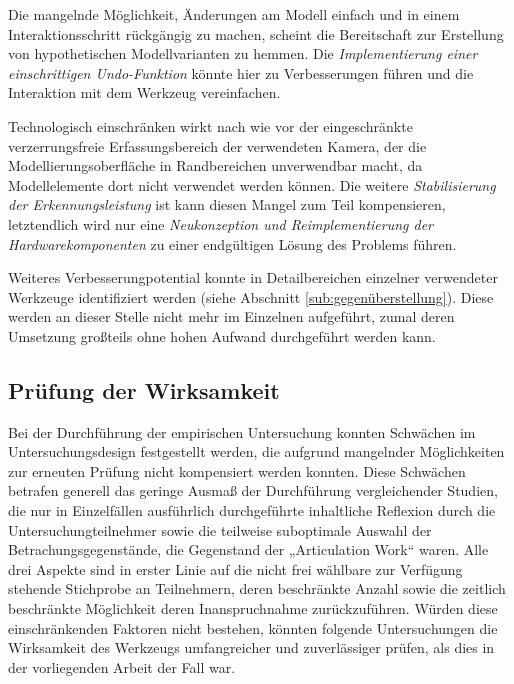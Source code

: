 Die mangelnde Möglichkeit, Änderungen am Modell einfach und in einem Interaktionsschritt rückgängig zu machen, scheint die Bereitschaft zur Erstellung von hypothetischen Modellvarianten zu hemmen. Die \emph{Implementierung einer einschrittigen Undo-Funktion} könnte hier zu Verbesserungen führen und die Interaktion mit dem Werkzeug vereinfachen.

Technologisch einschränken wirkt nach wie vor der eingeschränkte verzerrungsfreie Erfassungsbereich der verwendeten Kamera, der die Modellierungsoberfläche in Randbereichen unverwendbar macht, da Modellelemente dort nicht verwendet werden können. Die weitere \emph{Stabilisierung der Erkennungsleistung} ist kann diesen Mangel zum Teil kompensieren, letztendlich wird nur eine \emph{Neukonzeption und Reimplementierung der Hardwarekomponenten} zu einer endgültigen Lösung des Problems führen.

Weiteres Verbesserungpotential konnte in Detailbereichen einzelner verwendeter Werkzeuge identifiziert werden (siehe Abschnitt \ref{sub:gegenüberstellung}). Diese werden an dieser Stelle nicht mehr im Einzelnen aufgeführt, zumal deren Umsetzung großteils ohne hohen Aufwand durchgeführt werden kann.


\subsection{Prüfung der Wirksamkeit} %
\label{sub:prüfung_der_wirksamkeit}

Bei der Durchführung der empirischen Untersuchung konnten Schwächen im Untersuchungsdesign festgestellt werden, die aufgrund mangelnder Möglichkeiten zur erneuten Prüfung nicht kompensiert werden konnten. Diese Schwächen betrafen generell das geringe Ausmaß der Durchführung vergleichender Studien, die nur in Einzelfällen ausführlich durchgeführte inhaltliche Reflexion durch die Untersuchungteilnehmer sowie die teilweise suboptimale Auswahl der Betrachungsgegenstände, die Gegenstand der „Articulation Work“ waren. Alle drei Aspekte sind in erster Linie auf die nicht frei wählbare zur Verfügung stehende Stichprobe an Teilnehmern, deren beschränkte Anzahl sowie die zeitlich beschränkte Möglichkeit deren Inanspruchnahme zurückzuführen. Würden diese einschränkenden Faktoren nicht bestehen, könnten folgende Untersuchungen die Wirksamkeit des Werkzeugs umfangreicher und zuverlässiger prüfen, als dies in der vorliegenden Arbeit der Fall war.


